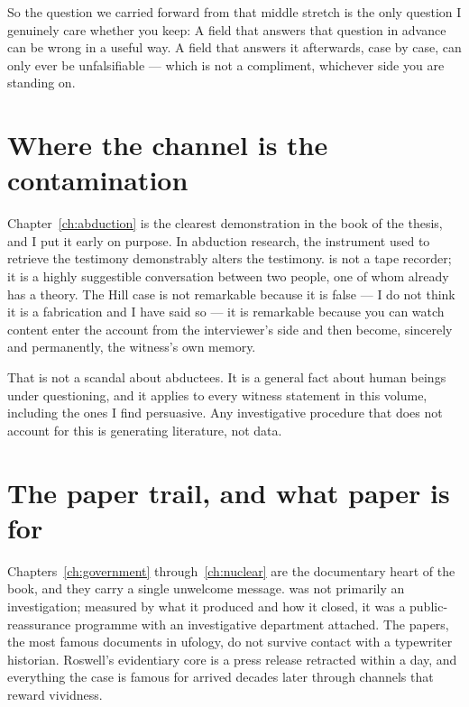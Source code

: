 So the question we carried forward from that middle stretch is the only question
I genuinely care whether you keep:  A field that answers that question
in advance can be wrong in a useful way. A field that answers it afterwards, case
by case, can only ever be unfalsifiable --- which is not a compliment, whichever
side you are standing on.

\section*{Where the channel is the contamination}

Chapter~\ref{ch:abduction} is the clearest demonstration in the book of the
thesis, and I put it early on purpose. In abduction research, the instrument used
to retrieve the testimony demonstrably alters the testimony.  is
not a tape recorder; it is a highly suggestible conversation between two people,
one of whom already has a theory. The Hill case is not remarkable because it is
false --- I do not think it is a fabrication and I have said so --- it is
remarkable because you can watch content enter the account from the interviewer's
side and then become, sincerely and permanently, the witness's own memory.

That is not a scandal about abductees. It is a general fact about human beings
under questioning, and it applies to every witness statement in this volume,
including the ones I find persuasive.  Any investigative
procedure that does not account for this is generating literature, not data.

\section*{The paper trail, and what paper is for}

Chapters~\ref{ch:government} through~\ref{ch:nuclear} are the documentary heart
of the book, and they carry a single unwelcome message. 
was not primarily an investigation; measured by what it produced and how it
closed, it was a public-reassurance programme with an investigative
department attached. The  papers, the most famous documents in
ufology, do not survive contact with a typewriter historian. Roswell's evidentiary
core is a press release retracted within a day, and everything the case is famous
for arrived decades later through channels that reward vividness.

